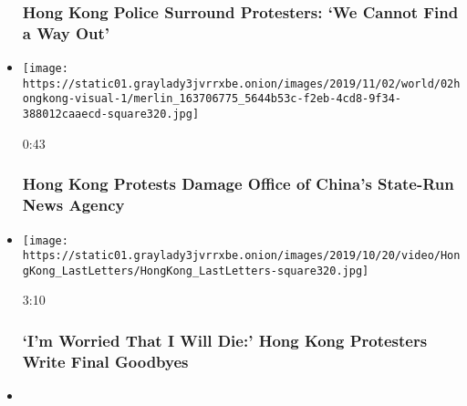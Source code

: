 \begin{itemize}
  \hypertarget{hong-kong-police-surround-protesters-we-cannot-find-a-way-out}{%
  \subsubsection{Hong Kong Police Surround Protesters: `We Cannot Find a
  Way
  Out'}\label{hong-kong-police-surround-protesters-we-cannot-find-a-way-out}}
\item
  \href{https://www.nytimes3xbfgragh.onion/video/world/asia/100000006804020/hong-kong-protests-damage-office-of-chinas-state-run-news-agency.html?action=click\&module=video-series-bar\&region=header\&pgtype=Article\&playlistId=video/hk-protest}{}

  \texttt{[image: https://static01.graylady3jvrrxbe.onion/images/2019/11/02/world/02hongkong-visual-1/merlin\_163706775\_5644b53c-f2eb-4cd8-9f34-388012caaecd-square320.jpg]}

  0:43

  \hypertarget{hong-kong-protests-damage-office-of-chinas-state-run-news-agency}{%
  \subsubsection{Hong Kong Protests Damage Office of China's State-Run
  News
  Agency}\label{hong-kong-protests-damage-office-of-chinas-state-run-news-agency}}
\item
  \href{https://www.nytimes3xbfgragh.onion/video/world/asia/100000006754031/hong-kong-protesters.html?action=click\&module=video-series-bar\&region=header\&pgtype=Article\&playlistId=video/hk-protest}{}

  \texttt{[image: https://static01.graylady3jvrrxbe.onion/images/2019/10/20/video/HongKong\_LastLetters/HongKong\_LastLetters-square320.jpg]}

  3:10

  \hypertarget{im-worried-that-i-will-die-hong-kong-protesters-write-final-goodbyes}{%
  \subsubsection{`I'm Worried That I Will Die:' Hong Kong Protesters
  Write Final
  Goodbyes}\label{im-worried-that-i-will-die-hong-kong-protesters-write-final-goodbyes}}
\item
  \href{https://www.nytimes3xbfgragh.onion/video/sports/basketball/100000006757507/adam-silver-china.html?action=click\&module=video-series-bar\&region=header\&pgtype=Article\&playlistId=video/hk-protest}{}


\end{itemize}
